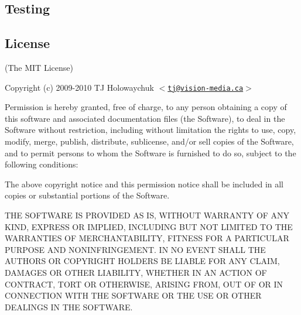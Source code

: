 \subsection*{Testing}



\subsection*{License}

(The M\+IT License)

Copyright (c) 2009-\/2010 TJ Holowaychuk $<$\href{mailto:tj@vision-media.ca}{\tt tj@vision-\/media.\+ca}$>$

Permission is hereby granted, free of charge, to any person obtaining a copy of this software and associated documentation files (the \textquotesingle{}Software\textquotesingle{}), to deal in the Software without restriction, including without limitation the rights to use, copy, modify, merge, publish, distribute, sublicense, and/or sell copies of the Software, and to permit persons to whom the Software is furnished to do so, subject to the following conditions\+:

The above copyright notice and this permission notice shall be included in all copies or substantial portions of the Software.

T\+HE S\+O\+F\+T\+W\+A\+RE IS P\+R\+O\+V\+I\+D\+ED \textquotesingle{}AS IS\textquotesingle{}, W\+I\+T\+H\+O\+UT W\+A\+R\+R\+A\+N\+TY OF A\+NY K\+I\+ND, E\+X\+P\+R\+E\+SS OR I\+M\+P\+L\+I\+ED, I\+N\+C\+L\+U\+D\+I\+NG B\+UT N\+OT L\+I\+M\+I\+T\+ED TO T\+HE W\+A\+R\+R\+A\+N\+T\+I\+ES OF M\+E\+R\+C\+H\+A\+N\+T\+A\+B\+I\+L\+I\+TY, F\+I\+T\+N\+E\+SS F\+OR A P\+A\+R\+T\+I\+C\+U\+L\+AR P\+U\+R\+P\+O\+SE A\+ND N\+O\+N\+I\+N\+F\+R\+I\+N\+G\+E\+M\+E\+NT. IN NO E\+V\+E\+NT S\+H\+A\+LL T\+HE A\+U\+T\+H\+O\+RS OR C\+O\+P\+Y\+R\+I\+G\+HT H\+O\+L\+D\+E\+RS BE L\+I\+A\+B\+LE F\+OR A\+NY C\+L\+A\+IM, D\+A\+M\+A\+G\+ES OR O\+T\+H\+ER L\+I\+A\+B\+I\+L\+I\+TY, W\+H\+E\+T\+H\+ER IN AN A\+C\+T\+I\+ON OF C\+O\+N\+T\+R\+A\+CT, T\+O\+RT OR O\+T\+H\+E\+R\+W\+I\+SE, A\+R\+I\+S\+I\+NG F\+R\+OM, O\+UT OF OR IN C\+O\+N\+N\+E\+C\+T\+I\+ON W\+I\+TH T\+HE S\+O\+F\+T\+W\+A\+RE OR T\+HE U\+SE OR O\+T\+H\+ER D\+E\+A\+L\+I\+N\+GS IN T\+HE S\+O\+F\+T\+W\+A\+RE. 